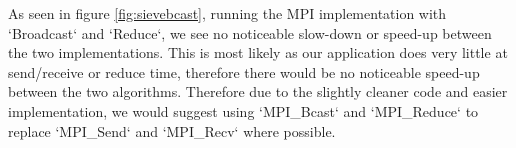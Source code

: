 As seen in figure \ref{fig:sievebcast}, running the MPI implementation with `Broadcast` and 
`Reduce`, we see no noticeable slow-down or speed-up between the two 
implementations. This is most likely as our application does very little at 
send/receive or reduce time, therefore there would be no noticeable speed-up 
between the two algorithms. Therefore due to the slightly cleaner code and easier 
implementation, we would suggest using `MPI\_Bcast` and `MPI\_Reduce` to replace 
`MPI\_Send` and `MPI\_Recv` where possible.
